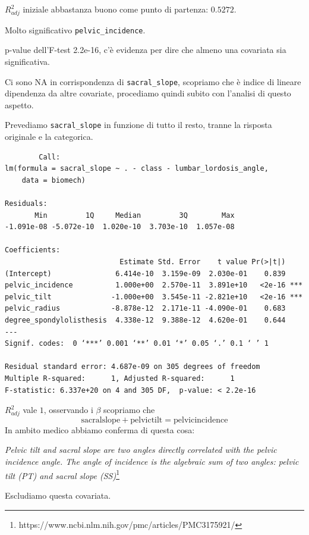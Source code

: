 \documentclass{beamer}
\begin{document}
\begin{frame}
	$R^2_{adj}$ iniziale abbastanza buono come punto di partenza: $0.5272$.

	Molto significativo \texttt{pelvic\_incidence}.

	p-value dell'F-test 2.2e-16, c'è evidenza per dire che almeno una covariata sia significativa.

	Ci sono NA in corrispondenza di \texttt{sacral\_slope}, scopriamo che è indice di lineare dipendenza da altre covariate, procediamo quindi subito con l'analisi di questo aspetto.
\end{frame}

\begin{frame}[fragile]
	Prevediamo \texttt{sacral\_slope} in funzione di tutto il resto, tranne la risposta originale e la categorica.

	{\tiny
	\begin{verbatim}
		Call:
lm(formula = sacral_slope ~ . - class - lumbar_lordosis_angle, 
    data = biomech)

Residuals:
       Min         1Q     Median         3Q        Max 
-1.091e-08 -5.072e-10  1.020e-10  3.703e-10  1.057e-08 

Coefficients:
                           Estimate Std. Error    t value Pr(>|t|)    
(Intercept)               6.414e-10  3.159e-09  2.030e-01    0.839    
pelvic_incidence          1.000e+00  2.570e-11  3.891e+10   <2e-16 ***
pelvic_tilt              -1.000e+00  3.545e-11 -2.821e+10   <2e-16 ***
pelvic_radius            -8.878e-12  2.171e-11 -4.090e-01    0.683    
degree_spondylolisthesis  4.338e-12  9.388e-12  4.620e-01    0.644    
---
Signif. codes:  0 ‘***’ 0.001 ‘**’ 0.01 ‘*’ 0.05 ‘.’ 0.1 ‘ ’ 1

Residual standard error: 4.687e-09 on 305 degrees of freedom
Multiple R-squared:      1,	Adjusted R-squared:      1 
F-statistic: 6.337e+20 on 4 and 305 DF,  p-value: < 2.2e-16
	\end{verbatim}
	}
\end{frame}


\begin{frame}
	$R^{2}_{adj}$ vale $1$, osservando i $\beta$ scopriamo che
	$$ \text{sacralslope} + \text{pelvictilt} = \text{pelvicincidence}$$
	In ambito medico abbiamo conferma di questa cosa:

	\textit{Pelvic tilt and sacral slope are two angles directly correlated with the pelvic incidence angle. The angle of incidence is the algebraic sum of two angles: pelvic tilt (PT) and sacral slope (SS)}\footnote{https://www.ncbi.nlm.nih.gov/pmc/articles/PMC3175921/}

	Escludiamo questa covariata.
\end{frame}
\end{document}
